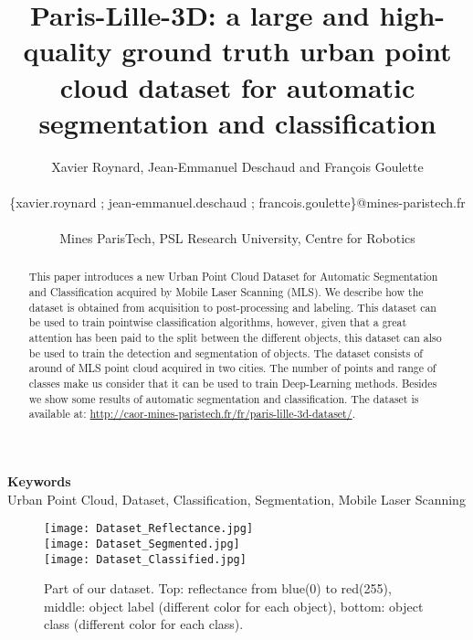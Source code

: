 \documentclass[a4paper, 10pt, journal]{article}
\begin{document}
\title{Paris-Lille-3D: a large and high-quality ground truth urban point cloud
dataset for automatic segmentation and classification}

\author{\hspace{-1.5cm} Xavier Roynard, Jean-Emmanuel Deschaud and François Goulette\\ \\
 \hspace{-1.0cm}\{xavier.roynard ; jean-emmanuel.deschaud ; francois.goulette\}@mines-paristech.fr
 \\ \\
\hspace{-1.2cm}Mines ParisTech, PSL Research University, Centre for Robotics}

\date{}

\maketitle

\begin{abstract}
This paper introduces a new Urban Point Cloud Dataset for Automatic Segmentation and Classification acquired by Mobile Laser Scanning (MLS). We describe how the dataset is obtained from acquisition to post-processing and labeling. This dataset can be used to train pointwise classification algorithms, however, given that a great attention has been paid to the split between the different objects, this dataset can also be used to train the detection and segmentation of objects.
The dataset consists of around  of MLS point cloud acquired in two cities. The number of points and range of classes make us consider that it can be used to train Deep-Learning methods.
Besides we show some results of automatic segmentation and classification. The dataset is available at: \href{http://caor-mines-paristech.fr/fr/paris-lille-3d-dataset/}{http://caor-mines-paristech.fr/fr/paris-lille-3d-dataset/}.
\end{abstract}

\begin{center}
 \textbf{\small Keywords} \\ Urban Point Cloud, Dataset, Classification, Segmentation, Mobile Laser Scanning
\end{center}

\begin{figure}\centering
 \texttt{[image: Dataset\_Reflectance.jpg]}\\
 \texttt{[image: Dataset\_Segmented.jpg]}\\
 \texttt{[image: Dataset\_Classified.jpg]}
\caption{Part of our dataset. Top: reflectance from blue(0) to red(255), middle: object label (different color for each object), bottom: object  class (different color for each class). \label{fig:dataset}}
\end{figure}
\end{document}
